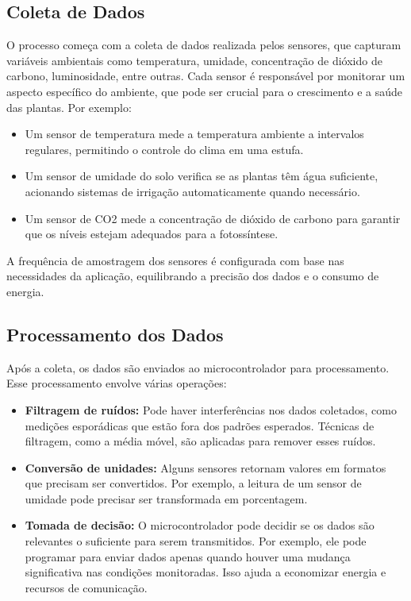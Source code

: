 \subsection{Coleta de Dados}

O processo começa com a coleta de dados realizada pelos sensores, que capturam variáveis ambientais como temperatura, umidade, concentração de dióxido de carbono, luminosidade, entre outras. Cada sensor é responsável por monitorar um aspecto específico do ambiente, que pode ser crucial para o crescimento e a saúde das plantas. Por exemplo:

\begin{itemize}
    \item Um sensor de temperatura mede a temperatura ambiente a intervalos regulares, permitindo o controle do clima em uma estufa.
    \item Um sensor de umidade do solo verifica se as plantas têm água suficiente, acionando sistemas de irrigação automaticamente quando necessário.
    \item Um sensor de CO2 mede a concentração de dióxido de carbono para garantir que os níveis estejam adequados para a fotossíntese.
\end{itemize}

A frequência de amostragem dos sensores é configurada com base nas necessidades da aplicação, equilibrando a precisão dos dados e o consumo de energia.

\subsection{Processamento dos Dados}

Após a coleta, os dados são enviados ao microcontrolador para processamento. Esse processamento envolve várias operações:
\begin{itemize}
    \item \textbf{Filtragem de ruídos:} Pode haver interferências nos dados coletados, como medições esporádicas que estão fora dos padrões esperados. Técnicas de filtragem, como a média móvel, são aplicadas para remover esses ruídos.
    \item \textbf{Conversão de unidades:} Alguns sensores retornam valores em formatos que precisam ser convertidos. Por exemplo, a leitura de um sensor de umidade pode precisar ser transformada em porcentagem.
    \item \textbf{Tomada de decisão:} O microcontrolador pode decidir se os dados são relevantes o suficiente para serem transmitidos. Por exemplo, ele pode programar para enviar dados apenas quando houver uma mudança significativa nas condições monitoradas. Isso ajuda a economizar energia e recursos de comunicação.
\end{itemize}

